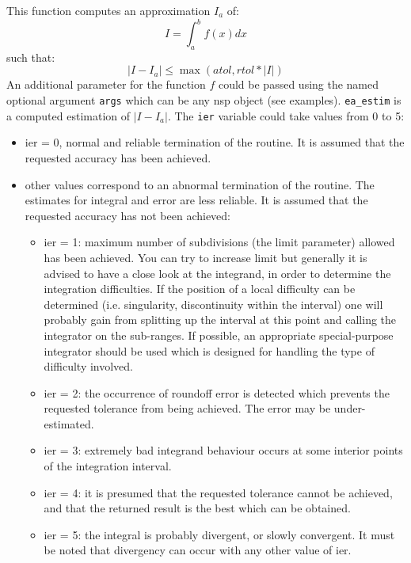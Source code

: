 \begin{mandescription}
This function computes an approximation $I_a$ of:
$$
   I = \int_a^b f(x) dx
$$
such that:
$$
   | I - I_a | \le  \max (atol, rtol*|I|)
$$
An additional parameter for the function $f$ could be passed using the
named optional argument \verb+args+ which can be any nsp object (see
examples). \verb+ea_estim+ is a computed estimation of $| I - I_a |$. The
\verb+ier+ variable could take values from 0 to 5: 
\begin{itemize}
\item ier = 0,  normal and reliable termination of the routine. It is assumed that the
      requested  accuracy has been achieved.
\item other values correspond to an abnormal termination of the routine. The estimates
      for integral and error are less reliable. It is assumed that the  requested accuracy
      has not been achieved:
      \begin{itemize}
      \item ier = 1: maximum number of subdivisions (the limit
            parameter) allowed has been achieved. You can try to
            increase limit but generally it is advised to have a close look at the
            integrand, in order to determine the integration
            difficulties. If the position of a local difficulty can
            be determined (i.e.  singularity, discontinuity within
            the interval) one will probably gain from  splitting up
            the interval at this point and calling the integrator
            on the sub-ranges. If possible, an appropriate
            special-purpose integrator should be used which is
            designed for handling the type  of difficulty involved.
      \item ier = 2: the occurrence of roundoff error is detected
            which prevents the requested tolerance from being
            achieved. The error may be under-estimated.
      \item ier = 3: extremely bad integrand behaviour occurs at 
            some interior points of the integration interval.
      \item ier = 4: it is presumed that the requested tolerance 
            cannot be achieved, and that the returned result is the
            best which can be obtained.
      \item ier = 5: the integral is probably divergent, or slowly
            convergent. It must be noted that divergency can occur with
            any other value of ier.
      \end{itemize}
\end{itemize}

\end{mandescription}

